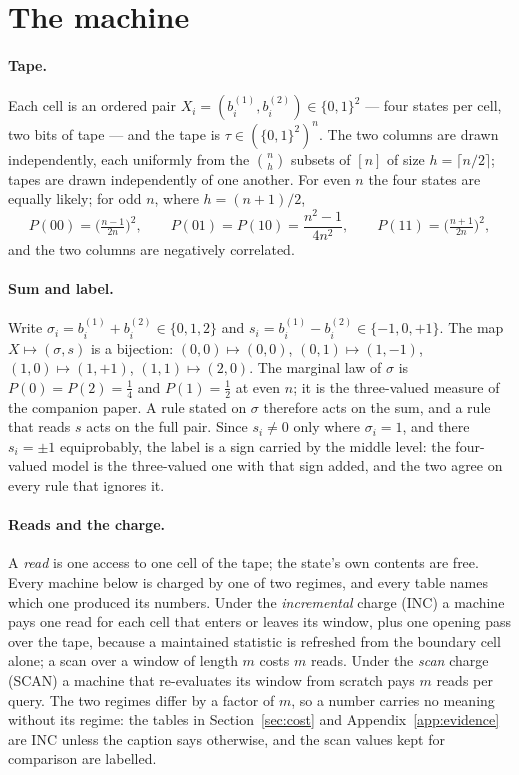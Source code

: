 \documentclass[11pt]{article}
\theoremstyle{remark}
\begin{document}
\section{The machine}\label{sec:machine}

\paragraph{Tape.} Each cell is an ordered pair $X_i=(b^{(1)}_i,b^{(2)}_i)\in\{0,1\}^{2}$ --- four
states per cell, two bits of tape --- and the tape is $\tau\in(\{0,1\}^{2})^{n}$. The two columns are
drawn independently, each uniformly from the $\binom nh$ subsets of $[n]$ of size $h=\lceil n/2\rceil$;
tapes are drawn independently of one another. For even $n$ the four states are equally likely; for odd
$n$, where $h=(n+1)/2$,
\[
P(00)=\Big(\tfrac{n-1}{2n}\Big)^{2},\qquad P(01)=P(10)=\frac{n^{2}-1}{4n^{2}},\qquad
P(11)=\Big(\tfrac{n+1}{2n}\Big)^{2},
\]
and the two columns are negatively correlated.

\paragraph{Sum and label.} Write $\sigma_i=b^{(1)}_i+b^{(2)}_i\in\{0,1,2\}$ and
$s_i=b^{(1)}_i-b^{(2)}_i\in\{-1,0,+1\}$. The map $X\mapsto(\sigma,s)$ is a bijection:
$(0,0)\mapsto(0,0)$, $(0,1)\mapsto(1,-1)$, $(1,0)\mapsto(1,+1)$, $(1,1)\mapsto(2,0)$.
The marginal law of $\sigma$ is $P(0)=P(2)=\tfrac14$ and $P(1)=\tfrac12$ at even $n$; it is the
three-valued measure of the companion paper. A rule stated on $\sigma$ therefore acts on the sum, and a
rule that reads $s$ acts on the full pair. Since $s_i\ne0$ only where $\sigma_i=1$, and there
$s_i=\pm1$ equiprobably, the label is a sign carried by the middle level: the four-valued model is the
three-valued one with that sign added, and the two agree on every rule that ignores it.

\paragraph{Reads and the charge.} A \emph{read} is one access to one cell of the tape; the state's
own contents are free. Every machine below is charged by one of two regimes, and every table names
which one produced its numbers. Under the \emph{incremental} charge (INC) a machine pays one read
for each cell that enters or leaves its window, plus one opening pass over the tape, because a
maintained statistic is refreshed from the boundary cell alone; a scan over a window of length $m$
costs $m$ reads. Under the \emph{scan} charge (SCAN) a machine that re-evaluates its window from
scratch pays $m$ reads per query. The two regimes differ by a factor of $m$, so a number carries no
meaning without its regime: the tables in Section~\ref{sec:cost} and Appendix~\ref{app:evidence}
are INC unless the caption says otherwise, and the scan values kept for comparison are labelled.
\end{document}
